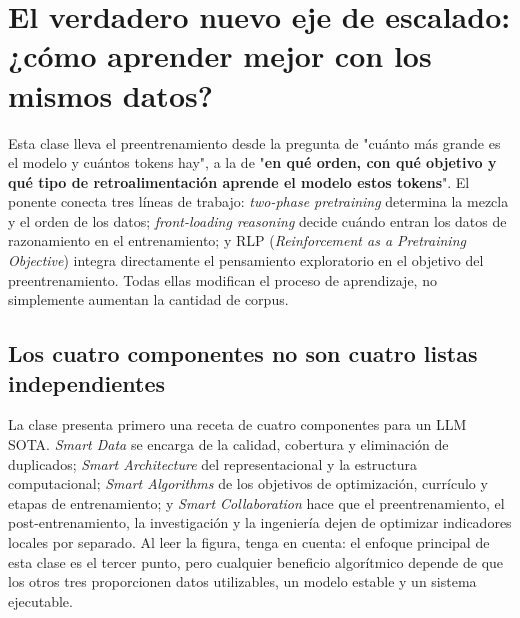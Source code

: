 \section{El verdadero nuevo eje de escalado: ¿cómo aprender mejor con los mismos datos?}

Esta clase lleva el preentrenamiento desde la pregunta de "cuánto más grande es el modelo y cuántos tokens hay", a la de "\textbf{en qué orden, con qué objetivo y qué tipo de retroalimentación aprende el modelo estos tokens}". El ponente conecta tres líneas de trabajo: \textit{two-phase pretraining} determina la mezcla y el orden de los datos; \textit{front-loading reasoning} decide cuándo entran los datos de razonamiento en el entrenamiento; y RLP (\textit{Reinforcement as a Pretraining Objective}) integra directamente el pensamiento exploratorio en el objetivo del preentrenamiento. Todas ellas modifican el proceso de aprendizaje, no simplemente aumentan la cantidad de corpus.

\subsection{Los cuatro componentes no son cuatro listas independientes}

La clase presenta primero una receta de cuatro componentes para un LLM SOTA. \textit{Smart Data} se encarga de la calidad, cobertura y eliminación de duplicados; \textit{Smart Architecture} del representacional y la estructura computacional; \textit{Smart Algorithms} de los objetivos de optimización, currículo y etapas de entrenamiento; y \textit{Smart Collaboration} hace que el preentrenamiento, el post-entrenamiento, la investigación y la ingeniería dejen de optimizar indicadores locales por separado. Al leer la figura, tenga en cuenta: el enfoque principal de esta clase es el tercer punto, pero cualquier beneficio algorítmico depende de que los otros tres proporcionen datos utilizables, un modelo estable y un sistema ejecutable.



